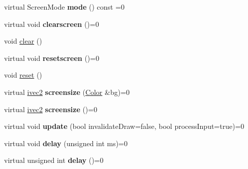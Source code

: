 \begin{DoxyCompactItemize}
\item 
\mbox{\label{classcturtle_1_1AbstractTurtleScreen_a6f4031d934f2785165b382384611b19d}} 
virtual Screen\+Mode {\bfseries mode} () const =0
\item 
\mbox{\label{classcturtle_1_1AbstractTurtleScreen_ad37d1976302819c74e766290a2128072}} 
virtual void {\bfseries clearscreen} ()=0
\item 
void \hyperlink{classcturtle_1_1AbstractTurtleScreen_abae240a2ba949c1628bb01ad850fb32b}{clear} ()
\item 
\mbox{\label{classcturtle_1_1AbstractTurtleScreen_a2a705428bc1fd07300ebcf1a6b10e989}} 
virtual void {\bfseries resetscreen} ()=0
\item 
void \hyperlink{classcturtle_1_1AbstractTurtleScreen_ac791e1eca792e71c356006c96eb98788}{reset} ()
\item 
\mbox{\label{classcturtle_1_1AbstractTurtleScreen_a67b23a8833900072eb9079b836b1796e}} 
virtual \hyperlink{structcturtle_1_1ivec2}{ivec2} {\bfseries screensize} (\hyperlink{classcturtle_1_1Color}{Color} \&bg)=0
\item 
\mbox{\label{classcturtle_1_1AbstractTurtleScreen_a9e8443b41b8d0765993b1b6fb5cfb94f}} 
virtual \hyperlink{structcturtle_1_1ivec2}{ivec2} {\bfseries screensize} ()=0
\item 
\mbox{\label{classcturtle_1_1AbstractTurtleScreen_a85ab4fad60333c90051219e32a299686}} 
virtual void {\bfseries update} (bool invalidate\+Draw=false, bool process\+Input=true)=0
\item 
\mbox{\label{classcturtle_1_1AbstractTurtleScreen_a779ca47025b1d005ab0dcc5a0c368ac8}} 
virtual void {\bfseries delay} (unsigned int ms)=0
\item 
\mbox{\label{classcturtle_1_1AbstractTurtleScreen_ab1d6569b39973c6df6507e4f9890407e}} 
virtual unsigned int {\bfseries delay} ()=0
\item 

\end{DoxyCompactItemize}
